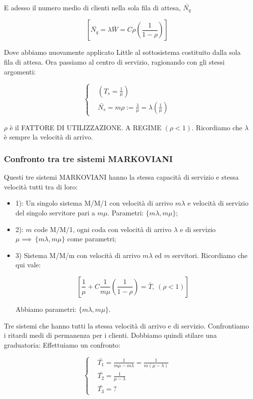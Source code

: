 E adesso il numero medio di clienti nella sola fila di attesa, $\bar{N_q}$

\[
	[\bar{N_q} = \lambda\bar{W} = C\rho(\frac{1}{1-\rho})]
\]

Dove abbiamo nuovamente applicato Little al sottosistema costituito dalla sola fila di attesa. Ora passiamo al centro di servizio, ragionando con gli stessi argomenti:

\[
	\left\{
	\begin{aligned}
	&(T_s=\frac{1}{\mu})\\
	&\bar{N_s} = m\rho := \frac{\lambda}{\mu} = \lambda(\frac{1}{\mu})
	\end{aligned}
	\right.
\]

$\rho$ è il FATTORE DI UTILIZZAZIONE. A REGIME $(\rho<1)$. Ricordiamo che $\lambda$ è sempre la velocità di arrivo.

\subsubsection{Confronto tra tre sistemi MARKOVIANI}

Questi tre sistemi MARKOVIANI hanno la stessa capacità di servizio e stessa velocità tutti tra di loro:

\begin{itemize}

\item{1)}: Un singolo sistema M/M/1 con velocità di arrivo $m\lambda$ e velocità di servizio del singolo servitore pari a $m\mu$. Parametri: $\{m\lambda,m\mu\}$;
\item{2)}: $m$ code M/M/1, ogni coda con velocità di arrivo $\lambda$ e di servizio $\mu \implies\ \{m\lambda,m\mu\}$ come parametri;
\item{3)} Sistema M/M/m con velocità di arrivo $m\lambda$ ed $m$ servitori. Ricordiamo che qui vale:

\[
	[\frac{1}{\mu} + C\frac{1}{m\mu}(\frac{1}{1-\rho}) = \bar{T},\ (\rho<1)]
\]

Abbiamo parametri: $\{m\lambda,m\mu\}$.

\end{itemize}

Tre sistemi che hanno tutti la stessa velocità di arrivo e di servizio. Confrontiamo i ritardi medi di permanenza per i clienti. Dobbiamo quindi stilare una graduatoria:
Effettuiamo un confronto:

\[
	\left\{
	\begin{aligned}
	&\bar{T_1} = \frac{1}{m\mu-m\lambda} = \frac{1}{m(\mu-\lambda)}\\
	&\bar{T_2} = \frac{1}{\mu-\lambda}\\
	&\bar{T_3} = ?
	\end{aligned}
	\right.
\]

